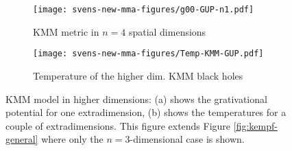 %
\begin{figure*}[t]
	\begin{subfigure}{.5\textwidth}
		\caption{KMM metric in $n=4$ spatial dimensions}
		\vspace*{-2mm}
		\texttt{[image: svens-new-mma-figures/g00-GUP-n1.pdf]}
	\end{subfigure}
	\begin{subfigure}{.5\textwidth}
		\caption{Temperature of the higher dim. KMM black holes}
		\vspace*{-2mm}
		\texttt{[image: svens-new-mma-figures/Temp-KMM-GUP.pdf]}
	\end{subfigure}
	\caption[
	Two panels: KMM in higher dimensions, metric and temperature,
	made with Mathematica,
	]{
		KMM model in higher dimensions: (a) shows the grativational
		potential for one extradimension, (b) shows the temperatures
		for a couple of extradimensions.
		This figure extends Figure \protect\ref{fig:kempf-general} where
		only the $n=3$-dimensional case is shown.
	}
	\label{fig:kempfextradimg00}
\end{figure*}

